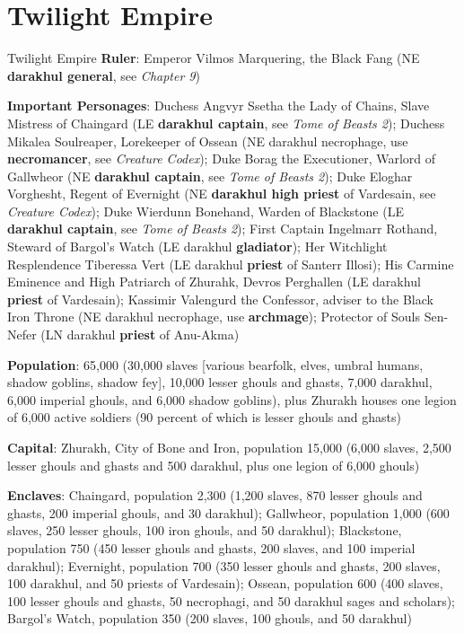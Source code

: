 \documentclass[10pt,a4paper,twoside,bg=print,twocolumn,openany,nodeprecatedcode]{dndbook}
\begin{document}
\section{Twilight Empire}
\begin{DndSidebar}[float=!b]{Twilight Empire}
\textbf{Ruler}: Emperor Vilmos Marquering, the Black Fang (NE \textbf{darakhul general}, see \textit{Chapter 9})



\textbf{Important Personages}: Duchess Angvyr Ssetha the Lady of Chains, Slave Mistress of Chaingard (LE \textbf{darakhul captain}, see \textit{Tome of Beasts 2}); Duchess Mikalea Soulreaper, Lorekeeper of Ossean (NE darakhul necrophage, use \textbf{necromancer}, see \textit{Creature Codex}); Duke Borag the Executioner, Warlord of Gallwheor (NE \textbf{darakhul captain}, see \textit{Tome of Beasts 2}); Duke Eloghar Vorghesht, Regent of Evernight (NE \textbf{darakhul high priest} of Vardesain, see \textit{Creature Codex}); Duke Wierdunn Bonehand, Warden of Blackstone (LE \textbf{darakhul captain}, see \textit{Tome of Beasts 2}); First Captain Ingelmarr Rothand, Steward of Bargol's Watch (LE darakhul \textbf{gladiator}); Her Witchlight Resplendence Tiberessa Vert (LE darakhul \textbf{priest} of Santerr Illosi); His Carmine Eminence and High Patriarch of Zhurahk, Devros Perghallen (LE darakhul \textbf{priest} of Vardesain); Kassimir Valengurd the Confessor, adviser to the Black Iron Throne (NE darakhul necrophage, use \textbf{archmage}); Protector of Souls Sen-Nefer (LN darakhul \textbf{priest} of Anu-Akma)



\textbf{Population}: 65,000 (30,000 slaves [various bearfolk, elves, umbral humans, shadow goblins, shadow fey], 10,000 lesser ghouls and ghasts, 7,000 darakhul, 6,000 imperial ghouls, and 6,000 shadow goblins), plus Zhurakh houses one legion of 6,000 active soldiers (90 percent of which is lesser ghouls and ghasts)



\textbf{Capital}: Zhurakh, City of Bone and Iron, population 15,000 (6,000 slaves, 2,500 lesser ghouls and ghasts and 500 darakhul, plus one legion of 6,000 ghouls)



\textbf{Enclaves}: Chaingard, population 2,300 (1,200 slaves, 870 lesser ghouls and ghasts, 200 imperial ghouls, and 30 darakhul); Gallwheor, population 1,000 (600 slaves, 250 lesser ghouls, 100 iron ghouls, and 50 darakhul); Blackstone, population 750 (450 lesser ghouls and ghasts, 200 slaves, and 100 imperial darakhul); Evernight, population 700 (350 lesser ghouls and ghasts, 200 slaves, 100 darakhul, and 50 priests of Vardesain); Ossean, population 600 (400 slaves, 100 lesser ghouls and ghasts, 50 necrophagi, and 50 darakhul sages and scholars); Bargol's Watch, population 350 (200 slaves, 100 ghouls, and 50 darakhul)




\end{DndSidebar}
\end{document}
